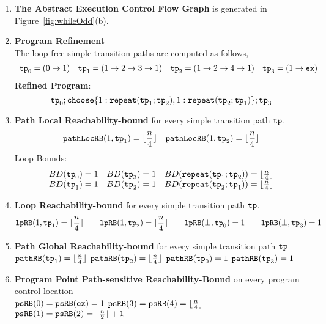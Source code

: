   \begin{enumerate}
    \item  \textbf{The Abstract Execution Control Flow Graph} is generated in Figure~\ref{fig:whileOdd}(b).
    \item \textbf{Program Refinement}
    \\
    The loop free simple transition paths are computed as follows,
    \[
    \begin{array}{llll}
      \mathtt{tp}_0 = (0 \to 1)
      &
      \mathtt{tp}_1 = (1 \to 2 \to 3 \to 1)
      &
      \mathtt{tp}_2 = (1 \to 2 \to 4 \to 1)
      &
      \mathtt{tp}_3 = (1 \to \mathtt{ex})
    \end{array}
    \]
  \textbf{Refined Program}:
  \[
    \tpath_0 ; \rpchoose{1: \rprepeat(\tpath_1; \tpath_2) , 
    1: \rprepeat(\tpath_2; \tpath_1)}; \tpath_3
  \]
    \item \textbf{Path Local Reachability-bound} for every simple transition path $\mathtt{tp}$.
    \[
      \mathtt{pathLocRB}(1, \mathtt{tp}_1) = \lfloor \frac{n}{4} \rfloor \quad
      \mathtt{pathLocRB}(1, \mathtt{tp}_2) = \lfloor \frac{n}{4} \rfloor
    \]
  Loop Bounds:
    \[
      \begin{array}{lll}
        BD(\mathtt{tp}_0) = 1
        &
        BD(\mathtt{tp}_3) = 1
        &
        BD(\mathtt{repeat}(\mathtt{tp}_1; \mathtt{tp}_2)) = \lfloor \frac{n}{4} \rfloor
        \\
        BD(\mathtt{tp}_1) = 1 
        &
        BD(\mathtt{tp}_2) = 1 
        &
        BD(\mathtt{repeat}(\mathtt{tp}_2; \mathtt{tp}_1)) = \lfloor \frac{n}{4} \rfloor
      \end{array}
      \]

    \item \textbf{{Loop Reachability-bound}} for every simple transition path $\mathtt{tp}$.
    \[
        \mathtt{lpRB}(1, \mathtt{tp}_1) = \lfloor \frac{n}{4} \rfloor
        \qquad
        \mathtt{lpRB}(1, \mathtt{tp}_2) = \lfloor \frac{n}{4} \rfloor
        \qquad
        \mathtt{lpRB}(\bot, \mathtt{tp}_0) = 1
        \qquad
        \mathtt{lpRB}(\bot, \mathtt{tp}_3) = 1
      \]
    \item \textbf{Path Global Reachability-bound} for every simple transition path $\mathtt{tp}$
    \\
    $\mathtt{pathRB}(\mathtt{tp}_1) = \lfloor \frac{n}{4} \rfloor $ \quad
    $\mathtt{pathRB}(\mathtt{tp}_2) = \lfloor \frac{n}{4} \rfloor $ \quad
    $\mathtt{pathRB}(\mathtt{tp}_0) = 1$ \quad
    $\mathtt{pathRB}(\mathtt{tp}_3) = 1$ 

    \item \textbf{Program Point Path-sensitive Reachability-Bound} on every program control location
  \\
  $\mathtt{psRB}(0) = \mathtt{psRB}(\mathtt{ex}) = 1$ \quad
  $\mathtt{psRB}(3) = \mathtt{psRB}(4) = \lfloor \frac{n}{4} \rfloor$ \quad
  $\mathtt{psRB}(1) = \mathtt{psRB}(2) = \lfloor \frac{n}{2} \rfloor + 1$ \quad
  \end{enumerate}